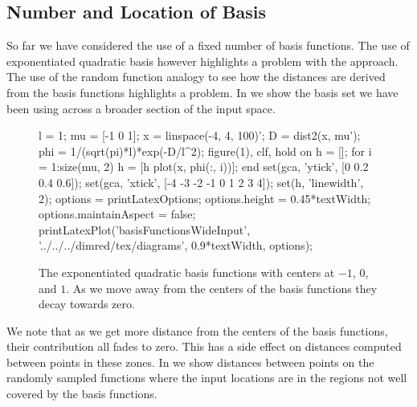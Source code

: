 \subsection{Number and Location of Basis}

So far we have considered the use of a fixed number of basis
functions. The use of exponentiated quadratic basis however highlights
a problem with the approach. The use of the random function analogy to
see how the distances are derived from the basis functions highlights
a problem. In  we show the basis
set we have been using across a broader section of the input space.
\begin{figure}
  \begin{matlab}
    l = 1;
    mu = [-1 0 1];
    x = linspace(-4, 4, 100)';
    D = dist2(x, mu');
    phi = 1/(sqrt(pi)*l)*exp(-D/l^2);
    figure(1), clf, hold on
    h = [];
    for i = 1:size(mu, 2)
      h = [h plot(x, phi(:, i))];
    end
    set(gca, 'ytick', [0 0.2 0.4 0.6]);
    set(gca, 'xtick', [-4 -3 -2 -1 0 1 2 3 4]);
    set(h, 'linewidth', 2);
    options = printLatexOptions;
    options.height = 0.45*textWidth; options.maintainAspect = false;
    printLatexPlot('basisFunctionsWideInput', '../../../dimred/tex/diagrams', 0.9*textWidth, options);
  \end{matlab}
  \begin{center}
    
  \end{center}
  \caption{The exponentiated quadratic basis functions with centers at
    $-1$, $0$, and $1$. As we move away from the centers of the basis
    functions they decay towards
    zero.}\label{fig:basisFunctionsWideInput}
\end{figure}
We note that as we get more distance from the centers of the basis functions, their contribution all fades to zero.  This has a side effect on distances computed between points in these zones. In  we show distances between points on the randomly sampled functions where the input locations are in the regions not well covered by the basis functions.

